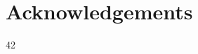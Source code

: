 \documentclass[preamble.tex]{subfiles}
\begin{document}
\clearpage

\chapter*{Acknowledgements}
42
\end{document}
